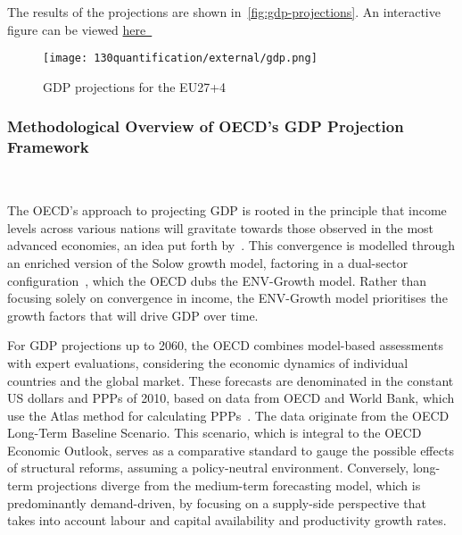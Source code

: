 The results of the projections are shown in~\autoref{fig:gdp-projections}. An interactive figure can be viewed \href{https://futuram-project.github.io/FutuRaM.github.io/WP2/assets.html}{here~\faLink}

\begin{landscape}
\begin{figure}[h!]
    \centering
    \texttt{[image: 130quantification/external/gdp.png]}
    \caption{GDP projections for the EU27+4}\label{fig:gdp-projections}
\end{figure}
\end{landscape}
\FloatBarrier

\subsubsection{Methodological Overview of OECD's GDP Projection Framework}~\cite{oecd2021gdpdata, oecd2021gdpmethod,duval2010gdp, oecd2012gdp}

The OECD's approach to projecting GDP is rooted in the principle that income levels across various nations will gravitate towards those observed in the most advanced economies, an idea put forth by~\cite{barro2004gdp, barro2004gdpbook}. This convergence is modelled through an enriched version of the Solow growth model, factoring in a dual-sector configuration~\cite{mankiw1992gdp}, which the OECD dubs the ENV-Growth model. Rather than focusing solely on convergence in income, the ENV-Growth model prioritises the growth factors that will drive GDP over time.

For GDP projections up to 2060, the OECD combines model-based assessments with expert evaluations, considering the economic dynamics of individual countries and the global market. These forecasts are denominated in the constant US dollars and PPPs of 2010, based on data from OECD and World Bank, which use the Atlas method for calculating PPPs~\cite{worldbank2023gdp,oecd2021gdpmethod}. The data originate from the OECD Long-Term Baseline Scenario. This scenario, which is integral to the OECD Economic Outlook, serves as a comparative standard to gauge the possible effects of structural reforms, assuming a policy-neutral environment. Conversely, long-term projections diverge from the medium-term forecasting model, which is predominantly demand-driven, by focusing on a supply-side perspective that takes into account labour and capital availability and productivity growth rates.



